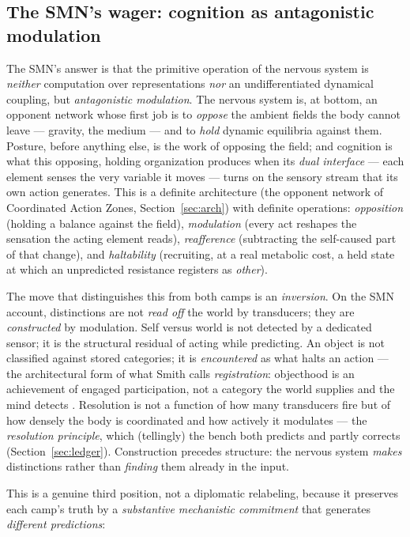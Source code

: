 \documentclass[utf8]{FrontiersinHarvard} %
\begin{document}
\subsection{The SMN's wager: cognition as antagonistic modulation}\label{sec:wager}

The SMN's answer is that the primitive operation of the nervous system is \emph{neither} computation over representations \emph{nor} an undifferentiated dynamical coupling, but \emph{antagonistic modulation}. The nervous system is, at bottom, an opponent network whose first job is to \emph{oppose} the ambient fields the body cannot leave --- gravity, the medium --- and to \emph{hold} dynamic equilibria against them. Posture, before anything else, is the work of opposing the field; and cognition is what this opposing, holding organization produces when its \emph{dual interface} --- each element senses the very variable it moves --- turns on the sensory stream that its own action generates. This is a definite architecture (the opponent network of Coordinated Action Zones, Section~\ref{sec:arch}) with definite operations: \emph{opposition} (holding a balance against the field), \emph{modulation} (every act reshapes the sensation the acting element reads), \emph{reafference} (subtracting the self-caused part of that change), and \emph{haltability} (recruiting, at a real metabolic cost, a held state at which an unpredicted resistance registers as \emph{other}).

The move that distinguishes this from both camps is an \emph{inversion}. On the SMN account, distinctions are not \emph{read off} the world by transducers; they are \emph{constructed} by modulation. Self versus world is not detected by a dedicated sensor; it is the structural residual of acting while predicting. An object is not classified against stored categories; it is \emph{encountered} as what halts an action --- the architectural form of what Smith calls \emph{registration}: objecthood is an achievement of engaged participation, not a category the world supplies and the mind detects \citep{Smith1996OriginObjects}. Resolution is not a function of how many transducers fire but of how densely the body is coordinated and how actively it modulates --- the \emph{resolution principle}, which (tellingly) the bench both predicts and partly corrects (Section~\ref{sec:ledger}). Construction precedes structure: the nervous system \emph{makes} distinctions rather than \emph{finding} them already in the input.

This is a genuine third position, not a diplomatic relabeling, because it preserves each camp's truth by a \emph{substantive mechanistic commitment} that generates \emph{different predictions}:
\end{document}

